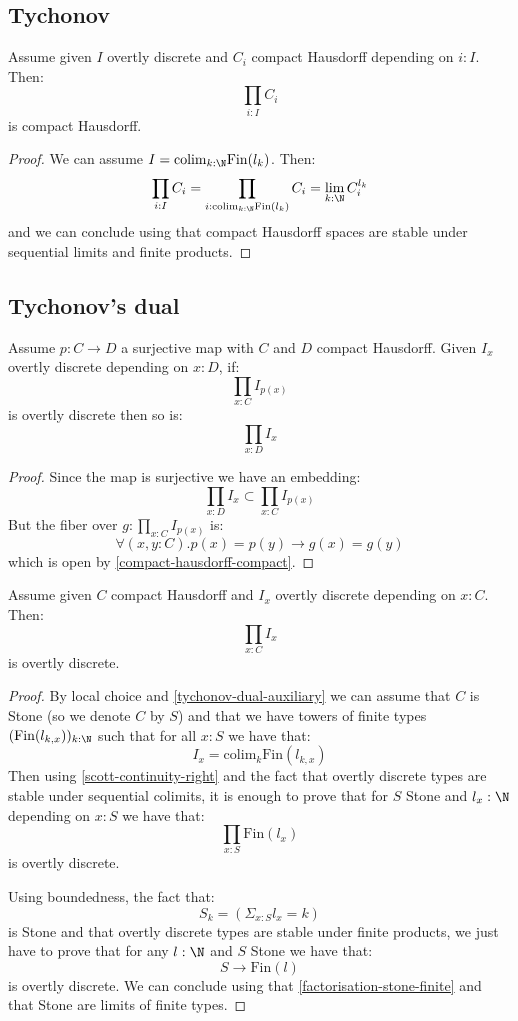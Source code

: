 \subsection{Tychonov}

\begin{theorem}[Tychonov]
Assume given $I$ overtly discrete and $C_i$ compact Hausdorff depending on $i:I$. Then:
\[\prod_{i:I}C_i\]
is compact Hausdorff.
\end{theorem}

\begin{proof}
We can assume $I = \mathrm{colim}_{k:\N}\mathrm{Fin}(l_k)$. Then:
\[\prod_{i:I}C_i = \prod_{i:\mathrm{colim}_{k:\N}\mathrm{Fin}(l_k)} C_i = \lim_{k:\N} C_i^{l_k}\]
and we can conclude using that compact Hausdorff spaces are stable under sequential limits and finite products.
\end{proof}

\subsection{Tychonov's dual}

\begin{lemma}\label{tychonov-dual-auxiliary}
Assume $p:C\to D$ a surjective map with $C$ and $D$ compact Hausdorff. Given $I_x$ overtly discrete depending on $x:D$, if:
\[\prod_{x:C}I_{p(x)}\]
is overtly discrete then so is:
\[\prod_{x:D}I_x\]
\end{lemma}

\begin{proof}
Since the map is surjective we have an embedding:
\[\prod_{x:D}I_x\subset \prod_{x:C}I_{p(x)}\]
But the fiber over $g:\prod_{x:C}I_{p(x)}$ is:
\[\forall (x,y:C). p(x)=p(y) \to g(x)=g(y)\]
which is open by \cref{compact-hausdorff-compact}.
\end{proof}

\begin{theorem}\label{tychonov-dual}
Assume given $C$ compact Hausdorff and $I_x$ overtly discrete depending on $x:C$. Then:
\[\prod_{x:C}I_x\]
is overtly discrete.
\end{theorem}

\begin{proof}
By local choice and \cref{tychonov-dual-auxiliary} we can assume that $C$ is Stone (so we denote $C$ by $S$) and that we have towers of finite types $(\mathrm{Fin}(l_{k,x}))_{k:\N}$ such that for all $x:S$ we have that:
\[I_x = \mathrm{colim}_k\mathrm{Fin}(l_{k,x})\] 
Then using \cref{scott-continuity-right} and the fact that overtly discrete types are stable under sequential colimits, it is enough to prove that for $S$ Stone and $l_x:\N$ depending on $x:S$ we have that:
\[\prod_{x:S}\mathrm{Fin}(l_{x})\]
is overtly discrete. 

Using boundedness, the fact that:
\[S_k = \left(\Sigma_{x:S} l_x = k\right)\] 
is Stone and that overtly discrete types are stable under finite products, we just have to prove that for any $l:\N$ and $S$ Stone we have that:
\[S\to \mathrm{Fin}(l)\]
is overtly discrete. We can conclude using that \cref{factorisation-stone-finite} and that Stone are limits of finite types.
\end{proof}


